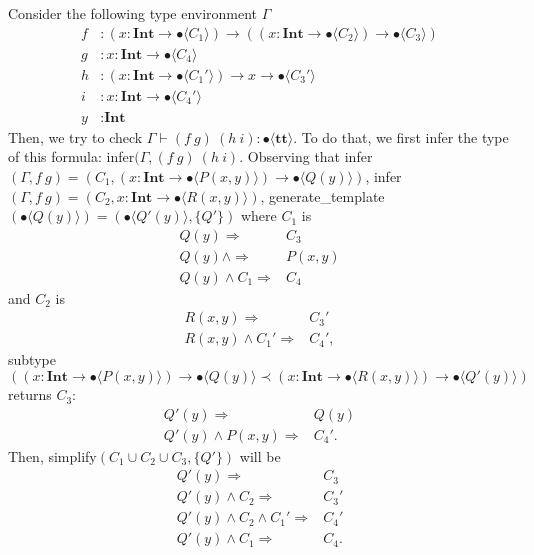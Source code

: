 \documentclass[runningheads]{llncs}
\newcommand \true {\textbf{tt}}
\newcommand \stypeint {\textbf{Int}}
\newcommand \stypebool {\bullet}
\newcommand \typeint[1]{{#1} : \stypeint}
\newcommand \typebool[1]{\stypebool \langle #1 \rangle}
\begin{document}
Consider the following type environment \(\Gamma\)
\begin{align*}
    f&: (\typeint{x} \to \typebool{C_1}) \to ((\typeint{x} \to \typebool{C_2})
    \to \typebool{C_3})\\
    g&: \typeint{x} \to \typebool{C_4}\\
    h&: (\typeint{x} \to \typebool{C_1'}) \to x \to \typebool{C_3'}\\
    i&: \typeint{x} \to \typebool{C_4'}\\
    y&: \stypeint
\end{align*}
Then, we try to check \(\Gamma \vdash (f\ g)\ (h\ i): \typebool{\true}\).
To do that, we first infer the type of this formula: infer\((\Gamma, (f\ g)\
(h\ i)\).
Observing that infer\((\Gamma, f\ g) = (C_1, (\typeint{x} \rightarrow
\typebool{P(x, y)}) \rightarrow \typebool{Q(y)} )\), infer\((\Gamma, f\ g)
= (C_2, \typeint{x} \rightarrow \typebool{R(x, y)})\),
generate\_template\((\typebool{Q(y)}) = (\typebool{Q'(y)}, \{Q'\})\)
where \(C_1\) is
\begin{align*}
    Q(y) \Rightarrow &C_3\\
    Q(y) \land \Rightarrow &P(x, y)\\
    Q(y) \land C_1  \Rightarrow &C_4
\end{align*}
and \(C_2\) is
\begin{align*}
    R(x, y) \Rightarrow &C_3'\\
    R(x, y) \land C_1'\Rightarrow &C_4',
\end{align*}
subtype\(( (\typeint{x} \to \typebool{P(x, y)}) \to \typebool{Q(y)} \prec
(\typeint{x} \to \typebool{R(x, y)}) \to \typebool{Q'(y)}) \) returns \(C_3\):
\begin{align*}
    Q'(y) \Rightarrow &Q(y)\\
    Q'(y) \land P(x, y) \Rightarrow &C_4'.
\end{align*}
Then, simplify\((C_1 \cup C_2 \cup C_3, \{Q'\})\) will be
\begin{align*}
    Q'(y) \Rightarrow &C_3\\
    Q'(y) \land C_2 \Rightarrow &C_3'\\
    Q'(y) \land C_2 \land C_1' \Rightarrow &C_4'\\
    Q'(y) \land C_1 \Rightarrow &C_4.
\end{align*}
\end{document}
